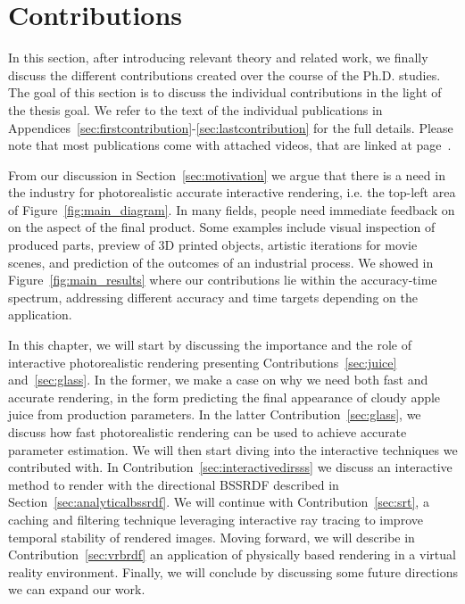 \chapter{Contributions}
\label{sec:contributions}
In this section, after introducing relevant theory and related work, we finally discuss the different contributions created over the course of the Ph.D. studies. The goal of this section is to discuss the individual contributions in the light of the thesis goal. We refer to the text of the individual publications in Appendices~\ref{sec:firstcontribution}-\ref{sec:lastcontribution} for the full details. Please note that most publications come with attached videos, that are linked at page~\pageref{sec:contributionlist}. 

From our discussion in Section~\ref{sec:motivation} we argue that there is a need in the industry for photorealistic accurate interactive rendering, i.e. the top-left area of Figure~\ref{fig:main_diagram}. In many fields, people need immediate feedback on on the aspect of the final product. Some examples include visual inspection of produced parts, preview of 3D printed objects, artistic iterations for movie scenes, and prediction of the outcomes of an industrial process. We showed in Figure~\ref{fig:main_results} where our contributions lie within the accuracy-time spectrum, addressing different accuracy and time targets depending on the application.

In this chapter, we will start by discussing the importance and the role of interactive photorealistic rendering presenting Contributions~\ref{sec:juice} and~\ref{sec:glass}. In the former, we make a case on why we need both fast and accurate rendering, in the form predicting the final appearance of cloudy apple juice from production parameters. In the latter Contribution~\ref{sec:glass}, we discuss how fast photorealistic rendering can be used to achieve accurate parameter estimation. We will then start diving into the interactive techniques we contributed with. In Contribution~\ref{sec:interactivedirsss} we discuss an interactive method to render with the directional BSSRDF described in Section~\ref{sec:analyticalbssrdf}. We will continue with Contribution~\ref{sec:srt}, a caching and filtering technique leveraging interactive ray tracing to improve temporal stability of rendered images. Moving forward, we will describe in Contribution~\ref{sec:vrbrdf} an application of physically based rendering in a virtual reality environment. Finally, we will conclude by discussing some future directions we can expand our work.

